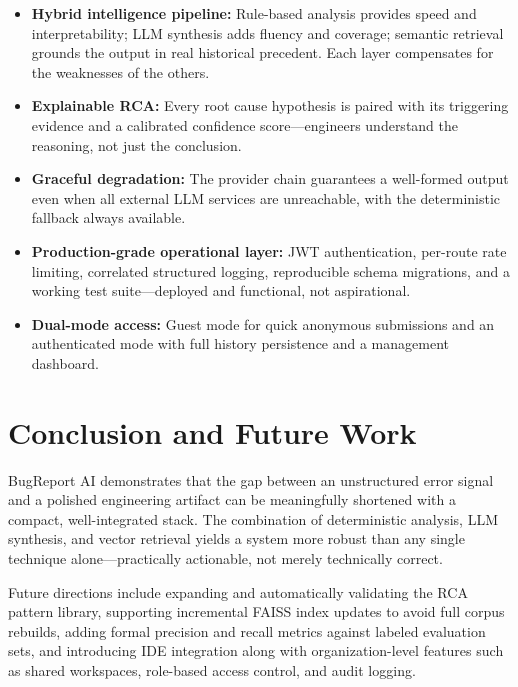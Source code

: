 \documentclass[12pt,a4paper]{article}
\begin{document}
\begin{itemize}[leftmargin=*, itemsep=2pt, topsep=2pt]
  \item \textbf{Hybrid intelligence pipeline:} Rule-based analysis provides speed and interpretability; LLM synthesis adds fluency and coverage; semantic retrieval grounds the output in real historical precedent. Each layer compensates for the weaknesses of the others.
  \item \textbf{Explainable RCA:} Every root cause hypothesis is paired with its triggering evidence and a calibrated confidence score---engineers understand the reasoning, not just the conclusion.
  \item \textbf{Graceful degradation:} The provider chain guarantees a well-formed output even when all external LLM services are unreachable, with the deterministic fallback always available.
  \item \textbf{Production-grade operational layer:} JWT authentication, per-route rate limiting, correlated structured logging, reproducible schema migrations, and a working test suite---deployed and functional, not aspirational.
  \item \textbf{Dual-mode access:} Guest mode for quick anonymous submissions and an authenticated mode with full history persistence and a management dashboard.
\end{itemize}

\section{Conclusion and Future Work}

BugReport AI demonstrates that the gap between an unstructured error signal and a polished engineering artifact can be meaningfully shortened with a compact, well-integrated stack. The combination of deterministic analysis, LLM synthesis, and vector retrieval yields a system more robust than any single technique alone---practically actionable, not merely technically correct.

Future directions include expanding and automatically validating the RCA pattern library, supporting incremental FAISS index updates to avoid full corpus rebuilds, adding formal precision and recall metrics against labeled evaluation sets, and introducing IDE integration along with organization-level features such as shared workspaces, role-based access control, and audit logging.
\end{document}
